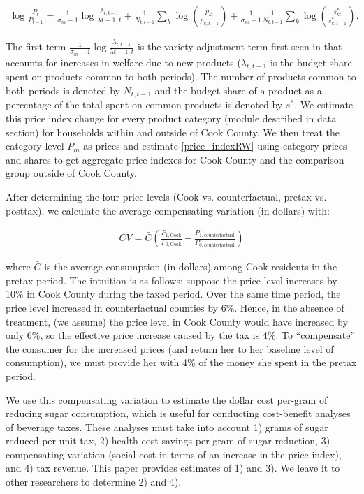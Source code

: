 \documentclass[12pt]{article}
\begin{document}
\begin{align}
\log \frac{P_t}{P_{t-1}} = \frac{1}{\sigma_m-1} \log \frac{\lambda_{t,t-1}}{\lambda{t-1,t}} + \frac{1}{N_{t,t-1}} \sum_k \log \left(\frac{p_{kt}}{p_{k,t-1}}\right) + \frac{1}{\sigma_m -1}\frac{1}{N_{t,t-1}} \sum_k \log\left(\frac{s^*_{kt}}{s^*_{k,t-1}} \right) \label{price_indexRW} .
\end{align}

The first term $\frac{1}{\sigma_m-1} \log \frac{\lambda_{t,t-1}}{\lambda{t-1,t}}$ is the variety adjustment term first seen in \textcite{feenstra1994new} that accounts for increases in welfare due to new products ($\lambda_{t,t-1}$ is the budget share spent on products common to both periods). The number of products common to both periods is denoted by $N_{t,t-1}$ and the budget share of a product as a percentage of the total spent on common products is denoted by $s^*$. We estimate this price index change for every product category (module described in data section) for households within and outside of Cook County. We then treat the category level $P_m$ as prices and estimate \eqref{price_indexRW} using category prices and shares to get aggregate price indexes for Cook County and the comparison group outside of Cook County.

After determining the four price levels (Cook vs. counterfactual, pretax vs. posttax), we calculate the average compensating variation (in dollars) with:

\begin{align}
CV = \bar{C}\left(\frac{P_{1,\text{Cook}}}{P_{0,\text{Cook}}} - \frac{P_{1,\text{counterfactual}}}{P_{0,\text{counterfactual}}}\right) \label{cv}
\end{align}

where $\bar{C}$ is the average consumption (in dollars) among Cook residents in the pretax period. The intuition is as follows: suppose the price level increases by 10\% in Cook County during the taxed period. Over the same time period, the price level increased in counterfactual counties by 6\%. Hence, in the absence of treatment, (we assume) the price level in Cook County would have increased by only 6\%, so the effective price increase caused by the tax is 4\%. To ``compensate'' the consumer for the increased prices (and return her to her baseline level of consumption), we must provide her with 4\% of the money she spent in the pretax period.

We use this compensating variation to estimate the dollar cost per-gram of reducing sugar consumption, which is useful for conducting cost-benefit analyses of beverage taxes. These analyses must take into account 1) grams of sugar reduced per unit tax, 2) health cost savings per gram of sugar reduction, 3) compensating variation (social cost in terms of an increase in the price index), and 4) tax revenue. This paper provides estimates of 1) and 3). We leave it to other researchers to determine 2) and 4).
\end{document}
